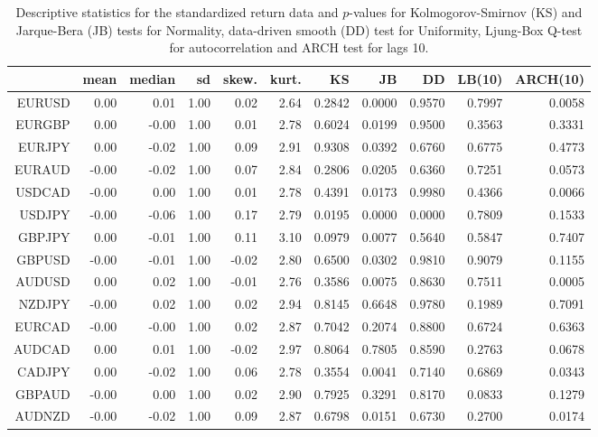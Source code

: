 \begin{table}[ht]
\centering
\begin{tabular}{rrrrrrrrrrr}
  \hline
 & mean & median & sd & skew. & kurt. & KS & JB & DD & LB(10) & ARCH(10) \\ 
  \hline
EURUSD & 0.00 & 0.01 & 1.00 & 0.02 & 2.64 & 0.2842 & 0.0000 & 0.9570 & 0.7997 & 0.0058 \\ 
  EURGBP & 0.00 & -0.00 & 1.00 & 0.01 & 2.78 & 0.6024 & 0.0199 & 0.9500 & 0.3563 & 0.3331 \\ 
  EURJPY & 0.00 & -0.02 & 1.00 & 0.09 & 2.91 & 0.9308 & 0.0392 & 0.6760 & 0.6775 & 0.4773 \\ 
  EURAUD & -0.00 & -0.02 & 1.00 & 0.07 & 2.84 & 0.2806 & 0.0205 & 0.6360 & 0.7251 & 0.0573 \\ 
  USDCAD & -0.00 & 0.00 & 1.00 & 0.01 & 2.78 & 0.4391 & 0.0173 & 0.9980 & 0.4366 & 0.0066 \\ 
  USDJPY & -0.00 & -0.06 & 1.00 & 0.17 & 2.79 & 0.0195 & 0.0000 & 0.0000 & 0.7809 & 0.1533 \\ 
  GBPJPY & 0.00 & -0.01 & 1.00 & 0.11 & 3.10 & 0.0979 & 0.0077 & 0.5640 & 0.5847 & 0.7407 \\ 
  GBPUSD & -0.00 & -0.01 & 1.00 & -0.02 & 2.80 & 0.6500 & 0.0302 & 0.9810 & 0.9079 & 0.1155 \\ 
  AUDUSD & 0.00 & 0.02 & 1.00 & -0.01 & 2.76 & 0.3586 & 0.0075 & 0.8630 & 0.7511 & 0.0005 \\ 
  NZDJPY & -0.00 & 0.02 & 1.00 & 0.02 & 2.94 & 0.8145 & 0.6648 & 0.9780 & 0.1989 & 0.7091 \\ 
  EURCAD & -0.00 & -0.00 & 1.00 & 0.02 & 2.87 & 0.7042 & 0.2074 & 0.8800 & 0.6724 & 0.6363 \\ 
  AUDCAD & 0.00 & 0.01 & 1.00 & -0.02 & 2.97 & 0.8064 & 0.7805 & 0.8590 & 0.2763 & 0.0678 \\ 
  CADJPY & 0.00 & -0.02 & 1.00 & 0.06 & 2.78 & 0.3554 & 0.0041 & 0.7140 & 0.6869 & 0.0343 \\ 
  GBPAUD & -0.00 & 0.00 & 1.00 & 0.02 & 2.90 & 0.7925 & 0.3291 & 0.8170 & 0.0833 & 0.1279 \\ 
  AUDNZD & -0.00 & -0.02 & 1.00 & 0.09 & 2.87 & 0.6798 & 0.0151 & 0.6730 & 0.2700 & 0.0174 \\ 
   \hline
\end{tabular}
\caption{Descriptive statistics for the standardized return data and
              $p$-values for Kolmogorov-Smirnov (KS) and 
             Jarque-Bera (JB) tests for Normality,
             data-driven smooth (DD) test for Uniformity, 
             Ljung-Box Q-test for autocorrelation and ARCH test for lags 10.} 
\label{table:standrets_desc_FX}
\end{table}
